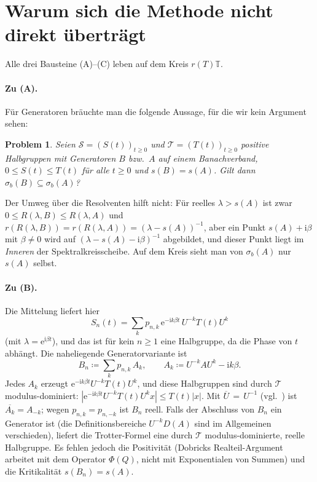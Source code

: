 \documentclass[11pt,a4paper]{article}
\newtheorem{problem}[satz]{Problem}
\theoremstyle{remark}
\theoremstyle{definition}
\newcommand{\T}{\mathbb{T}}
\newcommand{\TT}{\mathcal{T}}
\newcommand{\eu}{\mathrm{e}}
\newcommand{\im}{\mathrm{i}}
\begin{document}
\section{Warum sich die Methode nicht direkt überträgt}

Alle drei Bausteine (A)--(C) leben auf dem Kreis $r(T)\T$.

\paragraph{Zu (A).}
Für Generatoren bräuchte man die folgende Aussage, für die wir kein Argument sehen:

\begin{problem}\label{prob:vererbung}
Seien $\mathcal{S} = (S(t))_{t\ge0}$ und $\TT = (T(t))_{t\ge0}$ positive Halbgruppen mit Generatoren $B$ bzw.\ $A$ auf einem Banachverband, $0 \le S(t) \le T(t)$ für alle $t \ge 0$ und $s(B) = s(A)$.
Gilt dann $\sigma_b(B) \subseteq \sigma_b(A)$?
\end{problem}

Der Umweg über die Resolventen hilft nicht: Für reelles $\lambda > s(A)$ ist zwar $0 \le R(\lambda,B) \le R(\lambda,A)$ und $r(R(\lambda,B)) = r(R(\lambda,A)) = (\lambda - s(A))^{-1}$, aber ein Punkt $s(A) + \im\beta$ mit $\beta \neq 0$ wird auf $(\lambda - s(A) - \im\beta)^{-1}$ abgebildet, und dieser Punkt liegt im \emph{Inneren} der Spektralkreisscheibe.
Auf dem Kreis sieht man von $\sigma_b(A)$ nur $s(A)$ selbst.

\paragraph{Zu (B).}
Die Mittelung liefert hier
\[
  S_n(t) = \sum_{k} p_{n,k}\, \eu^{-\im k\beta t}\, U^{-k}T(t)U^{k}
\]
(mit $\lambda = \eu^{\im\beta t}$), und das ist für kein $n \ge 1$ eine Halbgruppe, da die Phase von $t$ abhängt.
Die naheliegende Generatorvariante ist
\[
  B_n \coloneqq \sum_{k} p_{n,k}\, A_k, \qquad A_k \coloneqq U^{-k}AU^{k} - \im k\beta .
\]
Jedes $A_k$ erzeugt $\eu^{-\im k\beta t}U^{-k}T(t)U^k$, und diese Halbgruppen sind durch $\TT$ modulus-dominiert: $|\eu^{-\im k\beta t}U^{-k}T(t)U^k x| \le T(t)|x|$.
Mit $\overline{U}\,{=}\,U^{-1}$ (vgl.\ \cite[Proposition~A.3]{dobrick}) ist $\overline{A_k} = A_{-k}$; wegen $p_{n,k} = p_{n,-k}$ ist $B_n$ reell.
Falls der Abschluss von $B_n$ ein Generator ist (die Definitionsbereiche $U^{-k}D(A)$ sind im Allgemeinen verschieden), liefert die Trotter-Formel eine durch $\TT$ modulus-dominierte, reelle Halbgruppe.
Es fehlen jedoch die Positivität (Dobricks Realteil-Argument arbeitet mit dem Operator $\Phi(Q)$, nicht mit Exponentialen von Summen) und die Kritikalität $s(B_n) = s(A)$.
\end{document}
